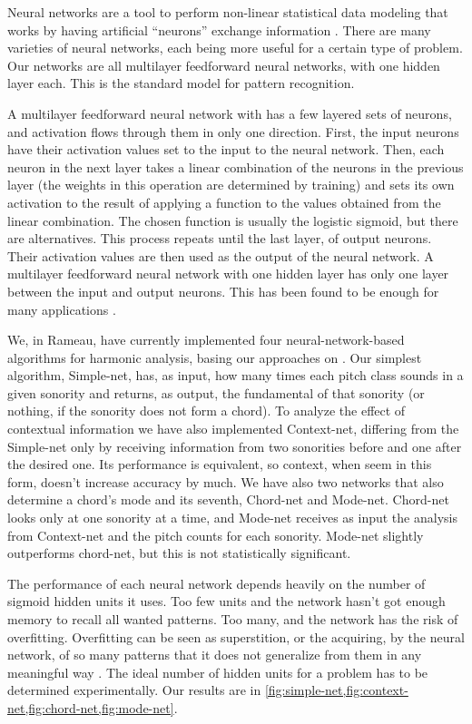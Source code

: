 \documentclass{article}
\begin{document}
Neural networks are a tool to perform non-linear statistical data
modeling that works by having artificial ``neurons'' exchange
information \cite{tsui02:_harmon_analy_using_neural_networ}. There are
many varieties of neural networks, each being more useful for a
certain type of problem. Our networks are all multilayer feedforward
neural networks, with one hidden layer each. This is the standard
model for pattern recognition.

A multilayer feedforward neural network with has a few layered sets of
neurons, and activation flows through them in only one
direction. First, the input neurons have their activation values set
to the input to the neural network. Then, each neuron in the next
layer takes a linear combination of the neurons in the previous layer
(the weights in this operation are determined by training) and sets
its own activation to the result of applying a function to the values
obtained from the linear combination. The chosen function is usually
the logistic sigmoid, but there are alternatives. This process repeats
until the last layer, of output neurons. Their activation values are
then used as the output of the neural network. A multilayer
feedforward neural network with one hidden layer has only one layer
between the input and output neurons. This has been found to be enough
for many applications \cite{tsui02:_harmon_analy_using_neural_networ}.

We, in Rameau, have currently implemented four neural-network-based
algorithms for harmonic analysis, basing our approaches on
\cite{tsui02:_harmon_analy_using_neural_networ}. Our simplest
algorithm, Simple-net, has, as input, how many times each pitch class
sounds in a given sonority and returns, as output, the fundamental of
that sonority (or nothing, if the sonority does not form a chord). To
analyze the effect of contextual information we have also implemented
Context-net, differing from the Simple-net only by receiving
information from two sonorities before and one after the desired
one. Its performance is equivalent, so context, when seem in this
form, doesn't increase accuracy by much. We have also two networks
that also determine a chord's mode and its seventh, Chord-net and
Mode-net. Chord-net looks only at one sonority at a time, and Mode-net
receives as input the analysis from Context-net and the pitch counts
for each sonority. Mode-net slightly outperforms chord-net, but this
is not statistically significant.

The performance of each neural network depends heavily on the number
of sigmoid hidden units it uses. Too few units and the network hasn't
got enough memory to recall all wanted patterns. Too many, and the
network has the risk of overfitting. Overfitting can be seen as
superstition, or the acquiring, by the neural network, of so many
patterns that it does not generalize from them in any meaningful way
\cite{white95:superstition}. The ideal number of hidden units for a
problem has to be determined experimentally. Our results are in
\ref{fig:simple-net,fig:context-net,fig:chord-net,fig:mode-net}.
\end{document}
